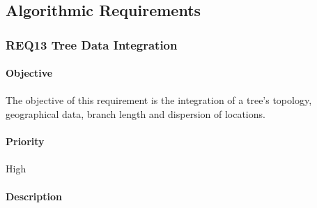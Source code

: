 \documentclass[10pt,a4paper]{article}
\begin{document}
	
\subsection{Algorithmic Requirements}

  \subsubsection{REQ13 Tree Data Integration}
\label{subsection-data-integration}
\paragraph{Objective}
\paragraph{}
The objective of this requirement is the integration of a tree's topology, geographical data, branch length and dispersion of locations.
\paragraph{Priority}
\paragraph{}
High
\paragraph{Description}
\end{document}
